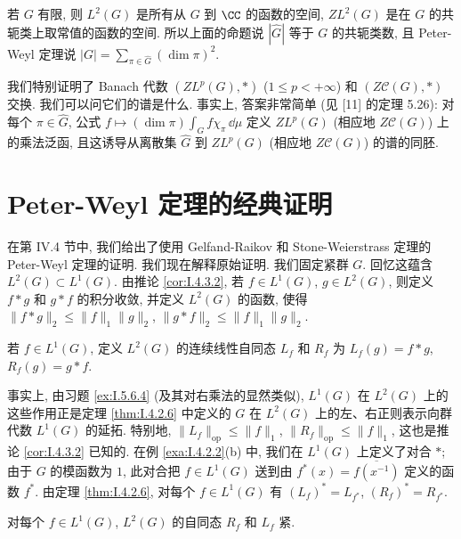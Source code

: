 \begin{remark}[有限群的情形]
\label{rem:IV.7.8}
若 $G$ 有限, 则 $L^2(G)$ 是所有从 $G$ 到 $\CC$ 的函数的空间, $ZL^2(G)$ 是在 $G$ 的共轭类上取常值的函数的空间. 所以上面的命题说 $|\widehat{G}|$ 等于 $G$ 的共轭类数, 且 Peter-Weyl 定理说 $|G| = \sum_{\pi \in \widehat{G}}(\dim\pi)^2$.
\end{remark}

\begin{remark}[$ZL^p(G)$ 的谱]
\label{rem:IV.7.9}
我们特别证明了 Banach 代数 $(ZL^p(G), *)$ ($1 \leq p < +\infty$) 和 $(Z\mathcal{C}(G), *)$ 交换. 我们可以问它们的谱是什么. 事实上, 答案非常简单 (见 {[}11{]} 的定理 5.26): 对每个 $\pi \in \widehat{G}$, 公式 $f \longmapsto (\dim\pi)\int_G f\chi_{\pi}\,\dd\mu$ 定义 $ZL^p(G)$ (相应地 $Z\mathcal{C}(G)$) 上的乘法泛函, 且这诱导从离散集 $\widehat{G}$ 到 $ZL^p(G)$ (相应地 $Z\mathcal{C}(G)$) 的谱的同胚.
\end{remark}

\section{Peter-Weyl 定理的经典证明}
在第 IV.4 节中, 我们给出了使用 Gelfand-Raikov 和 Stone-Weierstrass 定理的 Peter-Weyl 定理的证明. 我们现在解释原始证明. 我们固定紧群 $G$. 回忆这蕴含 $L^2(G) \subset L^1(G)$.
由推论 \ref{cor:I.4.3.2}, 若 $f \in L^1(G)$, $g \in L^2(G)$, 则定义 $f * g$ 和 $g * f$ 的积分收敛, 并定义 $L^2(G)$ 的函数, 使得 $\|f * g\|_2 \leq \|f\|_1\|g\|_2$, $\|g * f\|_2 \leq \|f\|_1\|g\|_2$.

\begin{definition}[$L^2(G)$ 上的卷积算子]
\label{def:IV.8.1}
若 $f \in L^1(G)$, 定义 $L^2(G)$ 的连续线性自同态 $L_f$ 和 $R_f$ 为 $L_f(g) = f * g$, $R_f(g) = g * f$.
\end{definition}

事实上, 由习题 \ref{ex:I.5.6.4} (及其对右乘法的显然类似), $L^1(G)$ 在 $L^2(G)$ 上的这些作用正是定理 \ref{thm:I.4.2.6} 中定义的 $G$ 在 $L^2(G)$ 上的左、右正则表示向群代数 $L^1(G)$ 的延拓. 特别地, $\|L_f\|_{\mathrm{op}} \leq \|f\|_1$, $\|R_f\|_{\mathrm{op}} \leq \|f\|_1$, 这也是推论 \ref{cor:I.4.3.2} 已知的.
在例 \ref{exa:I.4.2.2}(b) 中, 我们在 $L^1(G)$ 上定义了对合 $*$; 由于 $G$ 的模函数为 $1$, 此对合把 $f \in L^1(G)$ 送到由 $f^*(x) = \overline{f(x^{-1})}$ 定义的函数 $f^*$. 由定理 \ref{thm:I.4.2.6}, 对每个 $f \in L^1(G)$ 有 $(L_f)^* = L_{f^*}$, $(R_f)^* = R_{f^*}$.

\begin{theorem}[卷积算子紧]
\label{thm:IV.8.2}
对每个 $f \in L^1(G)$, $L^2(G)$ 的自同态 $R_f$ 和 $L_f$ 紧.
\end{theorem}

